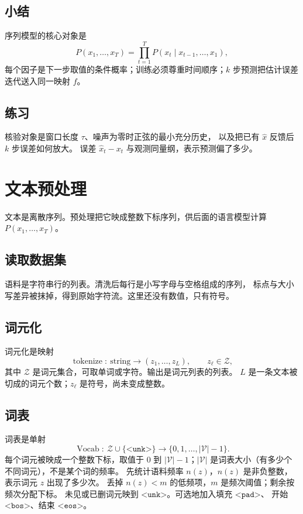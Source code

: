 \subsection{小结}

序列模型的核心对象是
\[
P(x_1,\ldots,x_T)=\prod_{t=1}^{T}P(x_t \mid x_{t-1},\ldots,x_1),
\]
每个因子是下一步取值的条件概率；训练必须尊重时间顺序；$k$ 步预测把估计误差迭代送入同一映射 $f$。

\subsection{练习}

核验对象是窗口长度 $\tau$、噪声为零时正弦的最小充分历史，
以及把已有 $\hat{x}$ 反馈后 $k$ 步误差如何放大。
误差 $\hat{x}_t-x_t$ 与观测同量纲，表示预测偏了多少。

\section{文本预处理}

文本是离散序列。预处理把它映成整数下标序列，供后面的语言模型计算
$P(x_1,\ldots,x_T)$。

\subsection{读取数据集}

语料是字符串行的列表。清洗后每行是小写字母与空格组成的序列，
标点与大小写差异被抹掉，得到原始字符流。这里还没有数值，只有符号。

\subsection{词元化}

词元化是映射
\[
\operatorname{tokenize}:\ \text{string}
\longrightarrow
(z_1,\ldots,z_L),\qquad z_\ell\in\mathcal{Z},
\]
其中 $\mathcal{Z}$ 是词元集合，可取单词或字符。输出是词元列表的列表。
$L$ 是一条文本被切成的词元个数；$z_\ell$ 是符号，尚未变成整数。

\subsection{词表}

词表是单射
\[
\operatorname{Vocab}:\ \mathcal{Z}\cup\{\texttt{<unk>}\}
\longrightarrow
\{0,1,\ldots,|\mathcal{V}|-1\}.
\]
每个词元被映成一个整数下标，取值于 $0$ 到 $|\mathcal{V}|-1$；$|\mathcal{V}|$ 是词表大小（有多少个不同词元），不是某个词的频率。
先统计语料频率 $n(z)$，$n(z)$ 是非负整数，表示词元 $z$ 出现了多少次。
丢掉 $n(z)<m$ 的低频项，$m$ 是频次阈值；剩余按频次分配下标。
未见或已删词元映到 $\texttt{<unk>}$。可选地加入填充 $\texttt{<pad>}$、
开始 $\texttt{<bos>}$、结束 $\texttt{<eos>}$。

